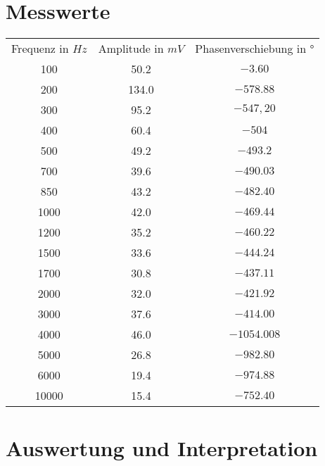 \section{Messwerte}
\begin{tabular}{ccc}
  Frequenz in $Hz$ & Amplitude in $mV$ &  Phasenverschiebung in $°$ \\
  100 & 50.2 & $-3.60$ \\
  200 & 134.0 & $-578.88$ \\
  300 & 95.2 & $-547,20$ \\
  400 & 60.4 & $-504$ \\
  500 & 49.2 & $-493.2$ \\
  700 & 39.6 & $-490.03$ \\
  850 & 43.2 & $-482.40$ \\
  1000 & 42.0 & $-469.44$ \\
  1200 & 35.2 & $-460.22$ \\
  1500 & 33.6 & $-444.24$ \\
  1700 & 30.8 & $-437.11$ \\
  2000 & 32.0 & $-421.92$ \\
  3000 & 37.6 & $-414.00$ \\
  4000 & 46.0 & $-1054.008$ \\
  5000 & 26.8 & $-982.80$ \\
  6000 & 19.4 & $-974.88$ \\
  10000 & 15.4 & $-752.40$ \\
 \end{tabular}
\label{chap:VERSUCH_2_MESSWERTE}

\section{Auswertung und Interpretation}
